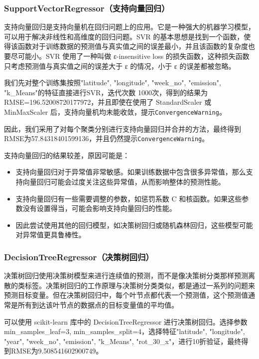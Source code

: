 \documentclass{ctexart}
\begin{document}
\subsubsection{SupportVectorRegressor（支持向量回归）}

支持向量回归是支持向量机在回归问题上的应用。它是一种强大的机器学习模型，可以用于解决非线性和高维度的回归问题。SVR 的基本思想是找到一个函数，使得该函数对于训练数据的预测值与真实值之间的误差最小，并且该函数的复杂度也要尽可能小。SVR 使用了一种叫做 ε-insensitive loss 的损失函数，这种损失函数只考虑预测值与真实值之间的误差大于 ε 的情况，小于 ε 的误差都被忽略。

我们先对整个训练集按照"latitude", "longitude", "week\_no", "emission", "k\_Means"的特征直接进行SVR，迭代次数 1000次，得到的结果为RMSE=196.52008720177972，并且即使在使用了 StandardScaler 或 MinMaxScaler 后，支持向量机均未能收敛，提示\texttt{ConvergenceWarning}。

因此，我们采用了对每个聚类分别进行支持向量回归并合并的方法，最终得到RMSE为57.84318401599136，并且仍然提示\texttt{ConvergenceWarning}。

支持向量回归的结果较差，原因可能是：

\begin{itemize}
      \item 支持向量回归对于异常值非常敏感。如果训练数据中包含很多异常值，那么支持向量回归可能会过度关注这些异常值，从而影响整体的预测性能。
      \item 支持向量回归有一些需要调整的参数，如惩罚系数 C 和核函数。如果这些参数没有设置得当，可能会影响支持向量回归的性能。
      \item 因此尝试使用其他的回归模型，如决策树回归或随机森林回归，这些模型可能对异常值更具鲁棒性。
\end{itemize}

\subsubsection{DecisionTreeRegressor（决策树回归）}

决策树回归使用决策树模型来进行连续值的预测，而不是像决策树分类那样预测离散的类标签。决策树回归的工作原理与决策树分类类似，都是通过一系列的问题来预测目标变量。但在决策树回归中，每个叶节点都代表一个预测值，这个预测值通常是所有到达该叶节点的数据点的目标变量值的平均值。

可以使用 scikit-learn 库中的 DecisionTreeRegressor 进行决策树回归。选择参数min\_samples\_leaf=3, min\_samples\_split=4，选择特征"latitude", "longitude", "year", "week\_no", "emission", "k\_Means", "rot\_30\_x"，进行10折验证，最终得到RMSE为9.508541602900749。
\end{document}
